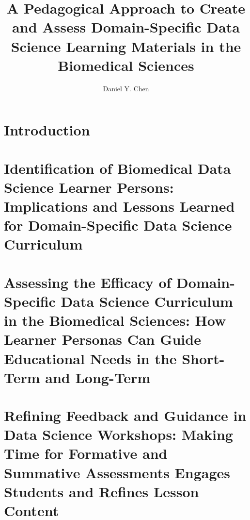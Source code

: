 \documentclass[doublespace,final,nopageskip]{VTthesis} %
\title{A Pedagogical Approach
       to Create and Assess
       Domain-Specific
       Data Science Learning Materials
       in the Biomedical Sciences}
\author{Daniel Y. Chen}
\begin{document}
  \frontmatter
  \maketitle
  \tableofcontents

    \listoffigures
    \listoftables
    \printnomenclature %
    

	\mainmatter

    \chapter{Introduction}
        \label{ch:introduction}
        

    \chapter{Identification of Biomedical Data Science Learner Persons:
             Implications and Lessons Learned for Domain-Specific Data Science Curriculum}
        \label{ch:persona_validation}
        

    \chapter{Assessing the Efficacy of Domain-Specific Data Science Curriculum in the Biomedical Sciences:
             How Learner Personas Can Guide Educational Needs in the Short-Term and Long-Term}
        \label{ch:workshop}
        

    \chapter{Refining Feedback and Guidance in Data Science Workshops:
             Making Time for Formative and Summative Assessments Engages Students and Refines Lesson Content}
        \label{ch:assessment}
        
\end{document}
